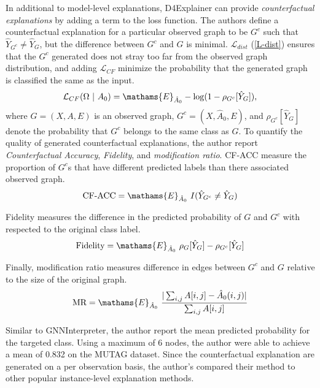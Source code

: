 \documentclass[
  11pt,
  letterpaper,
]{article}
\begin{document}
\quad In additional to model-level explanations, D4Explainer can provide
\emph{counterfactual explanations} by adding a term to the loss
function. The authors define a counterfactual explanation for a
particular observed graph to be \(G^c\) such that
\(\hat Y_{G^c} \neq \hat Y_G\), but the difference between \(G^c\) and
\(G\) is minimal. \(\mathcal{L}_{dist}\) (\ref{L-dist}) ensures that the
\(G^c\) generated does not stray too far from the observed graph
distribution, and adding \(\mathcal{L}_{CF}\) minimize the probability
that the generated graph is classified the same as the input.
\begin{equation}
         \mathcal{L}_{CF}(\Omega \ | \ A_0) = 
            \mathams{E}_{\hat A_0} - \log(1 - \rho_{G^c}[\hat Y_{G}]), 
    \end{equation} where \(G = (X, A, E)\) is an observed graph,
\(G^c = (X, \hat A_0, E)\), and \(\rho_{G^c}[\hat Y_{G}]\) denote the
probability that \(G^c\) belongs to the same class as \(G\). To quantify
the quality of generated counterfactual explanations, the author report
\emph{Counterfactual Accuracy}, \emph{Fidelity}, and \emph{modification
ratio}. CF-ACC measure the proportion of \(G^c\)s that have different
predicted labels than there associated observed graph.\\
\begin{equation}
            \text{CF-ACC} = \mathams{E}_{\hat A_0} \ I(\hat Y_{G^c} \neq \hat Y_{G}) 
    \end{equation}

Fidelity measures the difference in the predicted probability of \(G\)
and \(G^c\) with respected to the original class label.\\
\begin{equation}
        \text{Fidelity} = \mathams{E}_{\hat A_0} \ \rho_{G}[\hat Y_G] - \rho_{G^c}[\hat Y_G]
    \end{equation}

Finally, modification ratio measures difference in edges between \(G^c\)
and \(G\) relative to the size of the original graph.\\
\begin{equation}
        \text{MR} = \mathams{E}_{\hat A_0} \ \dfrac{|\sum_{i, j} A[i, j] - \hat A_0(i, j)|}{\sum_{i, j} A[i, j]}
    \end{equation}

\quad Similar to GNNInterpreter, the author report the mean predicted
probability for the targeted class. Using a maximum of 6 nodes, the
author were able to achieve a mean of 0.832 on the MUTAG dataset. Since
the counterfactual explanation are generated on a per observation basis,
the author's compared their method to other popular instance-level
explanation methods.
\end{document}

